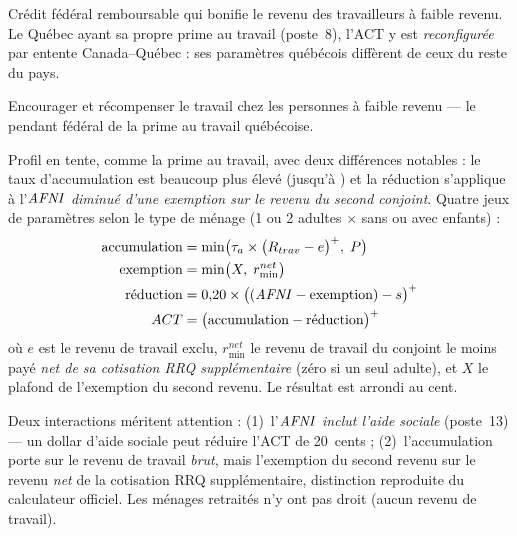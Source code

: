 
\pdesc Crédit fédéral remboursable qui bonifie le revenu des travailleurs à
faible revenu. Le Québec ayant sa propre prime au travail (poste~8), l'ACT y
est \emph{reconfigurée} par entente Canada--Québec : ses paramètres
québécois diffèrent de ceux du reste du pays.

\pobj Encourager et récompenser le travail chez les personnes à faible
revenu --- le pendant fédéral de la prime au travail québécoise.

\pregle Profil en tente, comme la prime au travail, avec deux différences
notables : le taux d'accumulation est beaucoup plus élevé (jusqu'à
) et la réduction s'applique à l'$\mathit{AFNI}$ \emph{diminué d'une
exemption sur le revenu du second conjoint}. Quatre jeux de paramètres
selon le type de ménage (1 ou 2 adultes $\times$ sans ou avec enfants) :
\begin{align*}
\text{accumulation} &= \min\bigl(\tau_a \times \bigl(R_{trav} - e\bigr)^{+},\; P\bigr) \\
\text{exemption} &= \min\bigl(X,\; r_{\min}^{net}\bigr) \\
\text{réduction} &= 0{,}20 \times \bigl((\mathit{AFNI} - \text{exemption}) - s\bigr)^{+} \\
ACT &= \bigl(\text{accumulation} - \text{réduction}\bigr)^{+}
\end{align*}
où $e$ est le revenu de travail exclu, $r_{\min}^{net}$ le revenu de
travail du conjoint le moins payé \emph{net de sa cotisation RRQ
supplémentaire} (zéro si un seul adulte), et $X$ le plafond de l'exemption
du second revenu. Le résultat est arrondi au cent.

Deux interactions méritent attention : (1)~l'$\mathit{AFNI}$ \emph{inclut l'aide
sociale} (poste~13) --- un dollar d'aide sociale peut réduire l'ACT de
20~cents ; (2)~l'accumulation porte sur le revenu de travail \emph{brut},
mais l'exemption du second revenu sur le revenu \emph{net} de la cotisation
RRQ supplémentaire, distinction reproduite du calculateur officiel. Les
ménages retraités n'y ont pas droit (aucun revenu de travail).

\pparams

